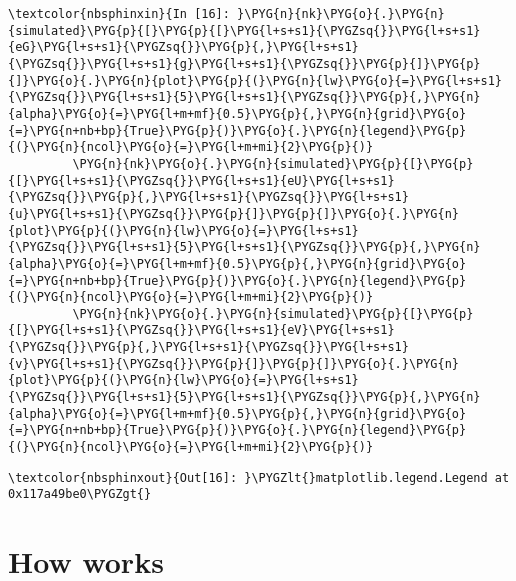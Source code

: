 \documentclass[letterpaper,10pt,openany,oneside,english]{sphinxmanual}
\begin{document}
\begin{Verbatim}[commandchars=\\\{\}]
\textcolor{nbsphinxin}{In [16]: }\PYG{n}{nk}\PYG{o}{.}\PYG{n}{simulated}\PYG{p}{[}\PYG{p}{[}\PYG{l+s+s1}{\PYGZsq{}}\PYG{l+s+s1}{eG}\PYG{l+s+s1}{\PYGZsq{}}\PYG{p}{,}\PYG{l+s+s1}{\PYGZsq{}}\PYG{l+s+s1}{g}\PYG{l+s+s1}{\PYGZsq{}}\PYG{p}{]}\PYG{p}{]}\PYG{o}{.}\PYG{n}{plot}\PYG{p}{(}\PYG{n}{lw}\PYG{o}{=}\PYG{l+s+s1}{\PYGZsq{}}\PYG{l+s+s1}{5}\PYG{l+s+s1}{\PYGZsq{}}\PYG{p}{,}\PYG{n}{alpha}\PYG{o}{=}\PYG{l+m+mf}{0.5}\PYG{p}{,}\PYG{n}{grid}\PYG{o}{=}\PYG{n+nb+bp}{True}\PYG{p}{)}\PYG{o}{.}\PYG{n}{legend}\PYG{p}{(}\PYG{n}{ncol}\PYG{o}{=}\PYG{l+m+mi}{2}\PYG{p}{)}
         \PYG{n}{nk}\PYG{o}{.}\PYG{n}{simulated}\PYG{p}{[}\PYG{p}{[}\PYG{l+s+s1}{\PYGZsq{}}\PYG{l+s+s1}{eU}\PYG{l+s+s1}{\PYGZsq{}}\PYG{p}{,}\PYG{l+s+s1}{\PYGZsq{}}\PYG{l+s+s1}{u}\PYG{l+s+s1}{\PYGZsq{}}\PYG{p}{]}\PYG{p}{]}\PYG{o}{.}\PYG{n}{plot}\PYG{p}{(}\PYG{n}{lw}\PYG{o}{=}\PYG{l+s+s1}{\PYGZsq{}}\PYG{l+s+s1}{5}\PYG{l+s+s1}{\PYGZsq{}}\PYG{p}{,}\PYG{n}{alpha}\PYG{o}{=}\PYG{l+m+mf}{0.5}\PYG{p}{,}\PYG{n}{grid}\PYG{o}{=}\PYG{n+nb+bp}{True}\PYG{p}{)}\PYG{o}{.}\PYG{n}{legend}\PYG{p}{(}\PYG{n}{ncol}\PYG{o}{=}\PYG{l+m+mi}{2}\PYG{p}{)}
         \PYG{n}{nk}\PYG{o}{.}\PYG{n}{simulated}\PYG{p}{[}\PYG{p}{[}\PYG{l+s+s1}{\PYGZsq{}}\PYG{l+s+s1}{eV}\PYG{l+s+s1}{\PYGZsq{}}\PYG{p}{,}\PYG{l+s+s1}{\PYGZsq{}}\PYG{l+s+s1}{v}\PYG{l+s+s1}{\PYGZsq{}}\PYG{p}{]}\PYG{p}{]}\PYG{o}{.}\PYG{n}{plot}\PYG{p}{(}\PYG{n}{lw}\PYG{o}{=}\PYG{l+s+s1}{\PYGZsq{}}\PYG{l+s+s1}{5}\PYG{l+s+s1}{\PYGZsq{}}\PYG{p}{,}\PYG{n}{alpha}\PYG{o}{=}\PYG{l+m+mf}{0.5}\PYG{p}{,}\PYG{n}{grid}\PYG{o}{=}\PYG{n+nb+bp}{True}\PYG{p}{)}\PYG{o}{.}\PYG{n}{legend}\PYG{p}{(}\PYG{n}{ncol}\PYG{o}{=}\PYG{l+m+mi}{2}\PYG{p}{)}
\end{Verbatim}

\begin{Verbatim}[commandchars=\\\{\}]
\textcolor{nbsphinxout}{Out[16]: }\PYGZlt{}matplotlib.legend.Legend at 0x117a49be0\PYGZgt{}
\end{Verbatim}

\noindent{}

\noindent{}

\noindent{}


\section{How  works}
\label{\detokenize{howLinearsolveWorks::doc}}\label{\detokenize{howLinearsolveWorks:How-linearsolve-works}}
\end{document}

